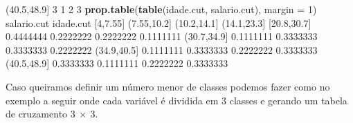 \documentclass[10pt,a4paper]{book}
\newenvironment{Shaded}{\begin{snugshade}}{\end{snugshade}}
\newcommand{\KeywordTok}[1]{\textcolor[rgb]{0.13,0.29,0.53}{\textbf{#1}}}
\newcommand{\DataTypeTok}[1]{\textcolor[rgb]{0.13,0.29,0.53}{#1}}
\newcommand{\DecValTok}[1]{\textcolor[rgb]{0.00,0.00,0.81}{#1}}
\newcommand{\FloatTok}[1]{\textcolor[rgb]{0.00,0.00,0.81}{#1}}
\newcommand{\NormalTok}[1]{#1}
\begin{document}
\begin{Shaded}
\begin{Highlighting}[]
\NormalTok{  (}\FloatTok{40.5}\NormalTok{,}\FloatTok{48.9}\NormalTok{]        }\DecValTok{3}           \DecValTok{1}           \DecValTok{2}           \DecValTok{3}
\KeywordTok{prop.table}\NormalTok{(}\KeywordTok{table}\NormalTok{(idade.cut, salario.cut), }\DataTypeTok{margin =} \DecValTok{1}\NormalTok{)}
\NormalTok{             salario.cut}
\NormalTok{idade.cut      [}\DecValTok{4}\NormalTok{,}\FloatTok{7.55}\NormalTok{] (}\FloatTok{7.55}\NormalTok{,}\FloatTok{10.2}\NormalTok{] (}\FloatTok{10.2}\NormalTok{,}\FloatTok{14.1}\NormalTok{] (}\FloatTok{14.1}\NormalTok{,}\FloatTok{23.3}\NormalTok{]}
\NormalTok{  [}\FloatTok{20.8}\NormalTok{,}\FloatTok{30.7}\NormalTok{] }\FloatTok{0.4444444}   \FloatTok{0.2222222}   \FloatTok{0.2222222}   \FloatTok{0.1111111}
\NormalTok{  (}\FloatTok{30.7}\NormalTok{,}\FloatTok{34.9}\NormalTok{] }\FloatTok{0.1111111}   \FloatTok{0.3333333}   \FloatTok{0.3333333}   \FloatTok{0.2222222}
\NormalTok{  (}\FloatTok{34.9}\NormalTok{,}\FloatTok{40.5}\NormalTok{] }\FloatTok{0.1111111}   \FloatTok{0.3333333}   \FloatTok{0.2222222}   \FloatTok{0.3333333}
\NormalTok{  (}\FloatTok{40.5}\NormalTok{,}\FloatTok{48.9}\NormalTok{] }\FloatTok{0.3333333}   \FloatTok{0.1111111}   \FloatTok{0.2222222}   \FloatTok{0.3333333}
\end{Highlighting}
\end{Shaded}

Caso queiramos definir um número menor de classes podemos fazer como no
exemplo a seguir onde cada variável é dividida em 3 classes e gerando um
tabela de cruzamento \(3~\times~3\).
\end{document}
